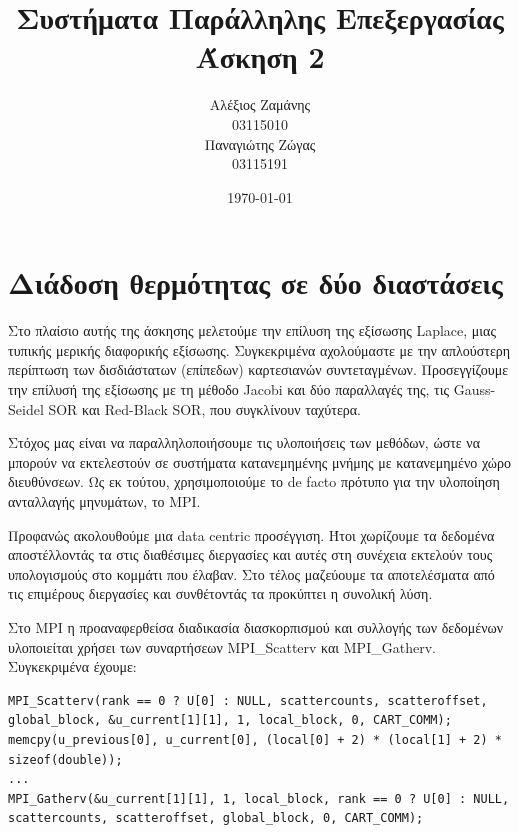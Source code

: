 \documentclass[12pt,titlepage]{article}
\begin{document}
\title{Συστήματα Παράλληλης Επεξεργασίας\\
    Άσκηση 2}
\author{Αλέξιος Ζαμάνης\\
    03115010\\
    Παναγιώτης Ζώγας\\
    03115191}
\date{\today}

\maketitle

\section{Διάδοση θερμότητας σε δύο διαστάσεις}

Στο πλαίσιο αυτής της άσκησης μελετούμε την επίλυση της εξίσωσης Laplace, μιας
τυπικής μερικής διαφορικής εξίσωσης. Συγκεκριμένα αχολούμαστε με την απλούστερη
περίπτωση των δισδιάστατων (επίπεδων) καρτεσιανών συντεταγμένων. Προσεγγίζουμε
την επίλυσή της εξίσωσης με τη μέθοδο Jacobi και δύο παραλλαγές της, τις
Gauss-Seidel SOR και Red-Black SOR, που συγκλίνουν ταχύτερα.

Στόχος μας είναι να παραλληλοποιήσουμε τις υλοποιήσεις των μεθόδων, ώστε να
μπορούν να εκτελεστούν σε συστήματα κατανεμημένης μνήμης με κατανεμημένο χώρο
διευθύνσεων. Ως εκ τούτου, χρησιμοποιούμε το de facto πρότυπο για την υλοποίηση
ανταλλαγής μηνυμάτων, το MPI.

Προφανώς ακολουθούμε μια data centric προσέγγιση. Ήτοι χωρίζουμε τα δεδομένα
αποστέλλοντάς τα στις διαθέσιμες διεργασίες και αυτές στη συνέχεια εκτελούν
τους υπολογισμούς στο κομμάτι που έλαβαν. Στο τέλος μαζεύουμε τα αποτελέσματα
από τις επιμέρους διεργασίες και συνθέτοντάς τα προκύπτει η συνολική λύση.

Στο MPI η προαναφερθείσα διαδικασία διασκορπισμού και συλλογής των δεδομένων
υλοποιείται χρήσει των συναρτήσεων MPI\_Scatterv και MPI\_Gatherv. Συγκεκριμένα
έχουμε:

\begin{verbatim}
MPI_Scatterv(rank == 0 ? U[0] : NULL, scattercounts, scatteroffset, global_block, &u_current[1][1], 1, local_block, 0, CART_COMM);
memcpy(u_previous[0], u_current[0], (local[0] + 2) * (local[1] + 2) * sizeof(double));
...
MPI_Gatherv(&u_current[1][1], 1, local_block, rank == 0 ? U[0] : NULL, scattercounts, scatteroffset, global_block, 0, CART_COMM);
\end{verbatim}
\end{document}
